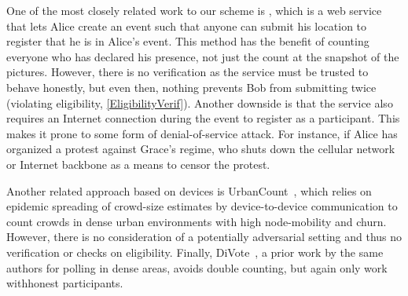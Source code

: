 One of the most closely related work to our scheme is \citet{CrowdCount}, which is a web service that lets Alice create an event such that anyone can submit his location to register that he is in Alice's event.
This method has the benefit of counting everyone who has declared his presence, not just the count at the snapshot of the pictures.
However, there is no verification as the service must be trusted to behave honestly, but even then, nothing prevents Bob from submitting twice (violating eligibility, \cref{EligibilityVerif}).
Another downside is that the service also requires an Internet connection during the event to register as a participant.
This makes it prone to some form of denial-of-service attack.
For instance, if Alice has organized a protest against Grace's regime, who shuts down the cellular network or Internet backbone as a means to censor the protest.

Another related approach based on devices is UrbanCount~\cite{UrbanCount}, which relies on epidemic spreading of crowd-size estimates by device-to-device communication to count crowds in dense urban environments with high node-mobility and churn.
However, there is no consideration of a potentially adversarial setting and thus no verification or checks on eligibility. 
Finally, DiVote~\cite{DiVote}, a prior work by the same authors for polling in dense areas, avoids double counting, but again only work withhonest participants.


